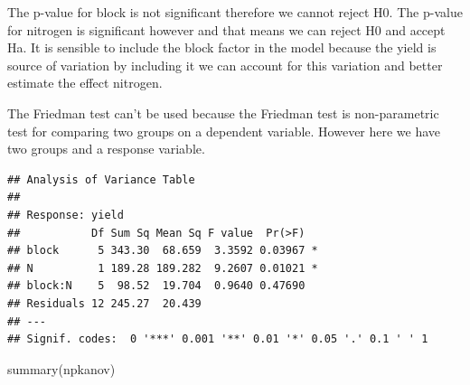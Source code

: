\documentclass[
]{article}
\newenvironment{Shaded}{\begin{snugshade}}{\end{snugshade}}
\newcommand{\AttributeTok}[1]{\textcolor[rgb]{0.77,0.63,0.00}{#1}}
\newcommand{\FunctionTok}[1]{\textcolor[rgb]{0.00,0.00,0.00}{#1}}
\newcommand{\NormalTok}[1]{#1}
\newcommand{\OtherTok}[1]{\textcolor[rgb]{0.56,0.35,0.01}{#1}}
\newcommand{\SpecialCharTok}[1]{\textcolor[rgb]{0.00,0.00,0.00}{#1}}
\begin{document}
The p-value for block is not significant therefore we cannot reject H0.
The p-value for nitrogen is significant however and that means we can
reject H0 and accept Ha. It is sensible to include the block factor in
the model because the yield is source of variation by including it we
can account for this variation and better estimate the effect nitrogen.

The Friedman test can't be used because the Friedman test is
non-parametric test for comparing two groups on a dependent variable.
However here we have two groups and a response variable.

\begin{Shaded}
\end{Shaded}

\begin{verbatim}
## Analysis of Variance Table
## 
## Response: yield
##           Df Sum Sq Mean Sq F value  Pr(>F)  
## block      5 343.30  68.659  3.3592 0.03967 *
## N          1 189.28 189.282  9.2607 0.01021 *
## block:N    5  98.52  19.704  0.9640 0.47690  
## Residuals 12 245.27  20.439                  
## ---
## Signif. codes:  0 '***' 0.001 '**' 0.01 '*' 0.05 '.' 0.1 ' ' 1
\end{verbatim}

\begin{Shaded}
\begin{Highlighting}[]
\FunctionTok{summary}\NormalTok{(npkanov)}
\end{Highlighting}
\end{Shaded}
\end{document}
